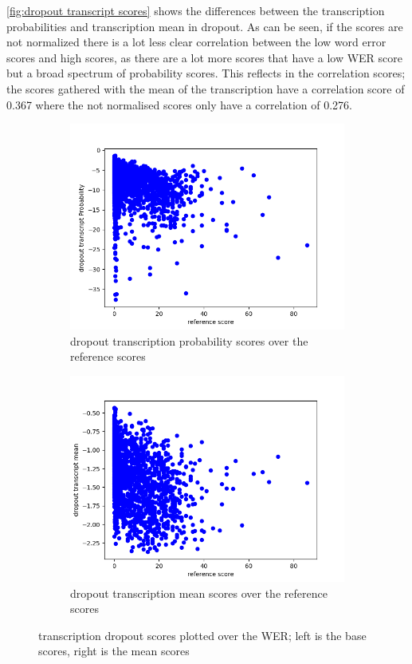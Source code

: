 \autoref{fig:dropout transcript scores} shows the differences between the transcription probabilities and transcription mean in dropout. 
As can be seen, if the scores are not normalized there is a lot less clear correlation between the low word error scores and high scores, as there are a lot more scores that have a low WER score but a broad spectrum of probability scores. This reflects in the correlation scores; the scores gathered with the mean of the transcription have a correlation score of 0.367 where the not normalised scores only have a correlation of 0.276. 
\begin{figure}[ht]
    \centering
    \begin{subfigure}{0.4\linewidth}
        \includegraphics[width=\textwidth]{Latex/sections/images/seamlessdropouttranscript.png}
        \caption{dropout transcription probability scores over the reference scores}
    \end{subfigure}
    \begin{subfigure}{0.4\linewidth}
        \includegraphics[width=\textwidth]{Latex/sections/images/seamlessdropouttranscriptmean.png}
        \caption{dropout transcription mean scores over the reference scores}
    \end{subfigure}
    \caption{transcription dropout scores plotted over the WER; left is the base scores, right is the mean scores}
    \label{fig:dropout transcript scores}
    \end{figure}

